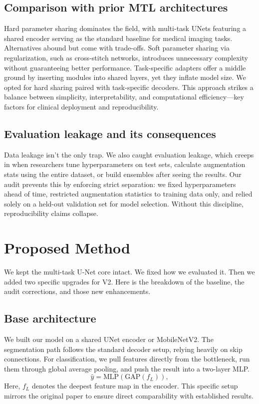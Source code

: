 \documentclass[conference,a4paper]{IEEEtran}
\begin{document}
\subsection{Comparison with prior MTL architectures}
Hard parameter sharing dominates the field, with multi-task UNets featuring a shared encoder serving as the standard baseline for medical imaging tasks. Alternatives abound but come with trade-offs. Soft parameter sharing via regularization, such as cross-stitch networks, introduces unnecessary complexity without guaranteeing better performance. Task-specific adapters offer a middle ground by inserting modules into shared layers, yet they inflate model size. We opted for hard sharing paired with task-specific decoders. This approach strikes a balance between simplicity, interpretability, and computational efficiency—key factors for clinical deployment and reproducibility.

\subsection{Evaluation leakage and its consequences}
Data leakage isn't the only trap. We also caught evaluation leakage, which creeps in when researchers tune hyperparameters on test sets, calculate augmentation stats using the entire dataset, or build ensembles after seeing the results. Our audit prevents this by enforcing strict separation: we fixed hyperparameters ahead of time, restricted augmentation statistics to training data only, and relied solely on a held-out validation set for model selection. Without this discipline, reproducibility claims collapse.

\section{Proposed Method}
We kept the multi-task U-Net core intact. We fixed how we evaluated it. Then we added two specific upgrades for V2. Here is the breakdown of the baseline, the audit corrections, and those new enhancements.

\subsection{Base architecture}
We built our model on a shared UNet encoder or MobileNetV2. The segmentation path follows the standard decoder setup, relying heavily on skip connections. For classification, we pull features directly from the bottleneck, run them through global average pooling, and push the result into a two-layer MLP.
\begin{equation}
\hat{y} = \mathrm{MLP}(\mathrm{GAP}(f_L)),
\end{equation}
Here, $f_L$ denotes the deepest feature map in the encoder. This specific setup mirrors the original paper to ensure direct comparability with established results.
\end{document}
